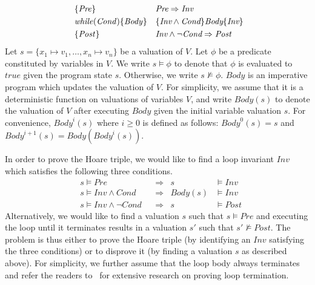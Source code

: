 \begin{align*}
&\{\mathit{Pre}\} & & \emph{Pre} \Rightarrow \emph{Inv} \\
&\mathit{while} (\mathit{Cond}) \{ \mathit{Body} \} && \{\emph{Inv} \wedge \emph{Cond}\} \emph{Body} \{\emph{Inv}\}\\\
&\{\mathit{Post}\} & & \emph{Inv} \wedge \neg \emph{Cond} \Rightarrow \emph{Post}
\end{align*}
Let $s = \{ x_1 \mapsto v_1, \ldots, x_n \mapsto v_n \}$ be a valuation of $V$. Let $\phi$ be a predicate constituted by variables in $V$. We write $s \models \phi$ to denote that $\phi$ is evaluated to $\mathit{true}$ given the program state $s$. Otherwise, we write $s \not \models \phi$. 
$\mathit{Body}$ is an imperative program which updates the valuation of $V$. For simplicity, we assume that it is a deterministic function on valuations of variables $V$, and write $\mathit{Body}(s)$ to denote the valuation of $V$ after executing $\mathit{Body}$ given the initial variable valuation $s$. For convenience, $\mathit{Body}^i(s)$ where $i \geq 0$ is defined as follows: $\mathit{Body}^0(s) = s$ and $\mathit{Body}^{i+1}(s) = \mathit{Body}(\mathit{Body}^i(s))$.

In order to prove the Hoare triple, we would like to find a loop invariant $\mathit{Inv}$ which satisfies the following three conditions.
\begin{align}
    &s \models \mathit{Pre}
        &&\Longrightarrow & s &\models \mathit{Inv} \label{inv:pre} \\
    &s \models \mathit{Inv} \wedge \mathit{Cond}
        &&\Longrightarrow & \mathit{Body}(s) &\models \mathit{Inv} \label{inv:loop} \\
    &s \models \mathit{Inv} \wedge \neg \mathit{Cond}
        &&\Longrightarrow & s &\models \mathit{Post} \label{inv:post}
\end{align}
Alternatively, we would like to find a valuation $s$ such that $s \models \mathit{Pre}$ and executing the loop until it terminates results in a valuation $s'$ such that $s' \not \models \mathit{Post}$.
The problem is thus either to prove the Hoare triple (by identifying an $\mathit{Inv}$ satisfying the three conditions) or to disprove it (by finding a valuation $s$ as described above). For simplicity, we further assume that the loop body always terminates and refer the readers to~\cite{Domagoj:FAC:2013,LeQC:PLDI:15,Hong:ASE:2015} %
for extensive research on proving loop termination.

